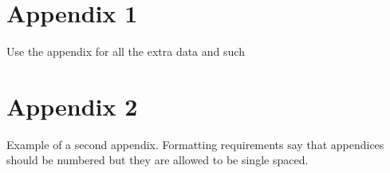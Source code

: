 \appendix

\chapter{Appendix 1}

Use the appendix for all the extra data and such

\chapter{Appendix 2}

Example of a second appendix.
Formatting requirements say that appendices should be numbered but they are allowed to be single spaced.